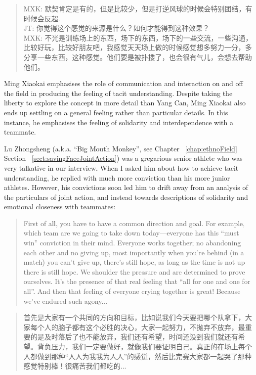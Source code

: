 \begin{CJK}{UTF8}{gbsn}
    \begin{quote}
        MXK: 默契肯定是有的，但是比较少，但是打逆风球的时候会特别团结，有时候会反超. \\
        JT: 你觉得这个感觉的来源是什么？如何才能得到这种效果？\\
        MXK: 不光是训练场上的东西，场下的东西，场下的一些交流，一些沟通，比较好玩，比较好朋友吧，我感觉天天场上做的时候感觉想多努力一分，多分享一些东西，这种感觉。他们要是被扑搂了，也会很有气儿，会想去帮助他们。 
    \end{quote}

Ming Xiaokai emphasises the role of communication and interaction on and off the field in producing the feeling of tacit understanding.  Despite taking the liberty to explore the concept in more detail than Yang Can, Ming Xiaokai also ends up settling on a general feeling rather than particular details.  In this instance, he emphasises the feeling of solidarity and interdependence with a teammate.

Lu Zhongsheng (a.k.a. ``Big Mouth Monkey'', see Chapter ~\ref{chap:ethnoField} Section ~\ref{sect:savingFaceJointAction}) was a gregarious senior athlete who was very talkative in our interview.  When I asked him about how to achieve tacit understanding, he replied with much more conviction than his more junior athletes.  However, his convictions soon led him to drift away from an analysis of the particulars of joint action, and instead towards descriptions of solidarity and emotional closeness with teammates:

    \begin{quote}
      First of all, you have to have a common direction and goal.  For example, which team are we going to take down today---everyone has this ``must win'' conviction in their mind.  Everyone works together; no abandoning each other and no giving up, most importantly when you’re behind (in a match) you can’t give up, there’s still hope, as long as the time is not up there is still hope.  We shoulder the pressure and are determined to prove ourselves.  It's the presence of that real feeling that ``all for one and one for all''.  And then that feeling of everyone crying together is great! Because we've endured such agony...
    \end{quote}

    \begin{quote}
      首先是大家有一个共同的方向和目标，比如说我们今天要把哪个队拿下，大家每个人的脑子都有这个必胜的决心，大家一起努力，不抛弃不放弃，最重要的是及时落后了也不能放弃，我们还有希望，时间还没到我们就还有希望。背负压力，我们一定要做好，就像我们要证明自己。真正的在场上每个人都做到那种“人人为我我为人人”的感觉，然后比完赛大家都一起哭了那种感觉特别棒！很痛苦我们都吃的...
    \end{quote}


\end{CJK}
